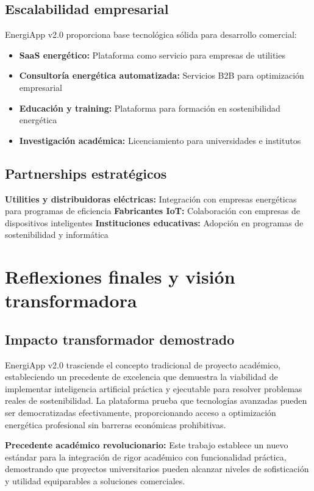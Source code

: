 \subsection{Escalabilidad empresarial}

EnergiApp v2.0 proporciona base tecnológica sólida para desarrollo comercial:

\begin{itemize}
    \item \textbf{SaaS energético:} Plataforma como servicio para empresas de utilities
    \item \textbf{Consultoría energética automatizada:} Servicios B2B para optimización empresarial
    \item \textbf{Educación y training:} Plataforma para formación en sostenibilidad energética
    \item \textbf{Investigación académica:} Licenciamiento para universidades e institutos
\end{itemize}

\subsection{Partnerships estratégicos}

\textbf{Utilities y distribuidoras eléctricas:} Integración con empresas energéticas para programas de eficiencia
\textbf{Fabricantes IoT:} Colaboración con empresas de dispositivos inteligentes
\textbf{Instituciones educativas:} Adopción en programas de sostenibilidad y informática

\section{Reflexiones finales y visión transformadora}

\subsection{Impacto transformador demostrado}

EnergiApp v2.0 trasciende el concepto tradicional de proyecto académico, estableciendo un precedente de excelencia que demuestra la viabilidad de implementar inteligencia artificial práctica y ejecutable para resolver problemas reales de sostenibilidad. La plataforma prueba que tecnologías avanzadas pueden ser democratizadas efectivamente, proporcionando acceso a optimización energética profesional sin barreras económicas prohibitivas.

\textbf{Precedente académico revolucionario:} Este trabajo establece un nuevo estándar para la integración de rigor académico con funcionalidad práctica, demostrando que proyectos universitarios pueden alcanzar niveles de sofisticación y utilidad equiparables a soluciones comerciales.

